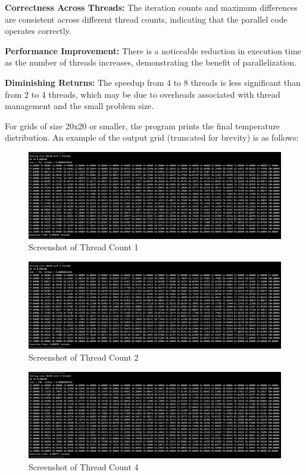 \documentclass{article}
\begin{document}
\textbf{Correctness Across Threads:} The iteration counts and maximum differences are consistent across different thread counts, indicating that the parallel code operates correctly.

\textbf{Performance Improvement:} There is a noticeable reduction in execution time as the number of threads increases, demonstrating the benefit of parallelization.

\textbf{Diminishing Returns:} The speedup from 4 to 8 threads is less significant than from 2 to 4 threads, which may be due to overheads associated with thread management and the small problem size.

For grids of size 20x20 or smaller, the program prints the final temperature distribution. An example of the output grid (truncated for brevity) is as follows:

\begin{figure}[H]
    \centering
    \includegraphics[width=\linewidth]{Images/Thread1.png}
    \caption{Screenshot of Thread Count 1}
    \label{fig:thread1}
\end{figure}

\begin{figure}[H]
    \centering
    \includegraphics[width=\linewidth]{Images/Thread2.png}
    \caption{Screenshot of Thread Count 2}
    \label{fig:thread2}
\end{figure}

\begin{figure}[H]
    \centering
    \includegraphics[width=\linewidth]{Images/Thread4.png}
    \caption{Screenshot of Thread Count 4}
    \label{fig:thread4}
\end{figure}
\end{document}
